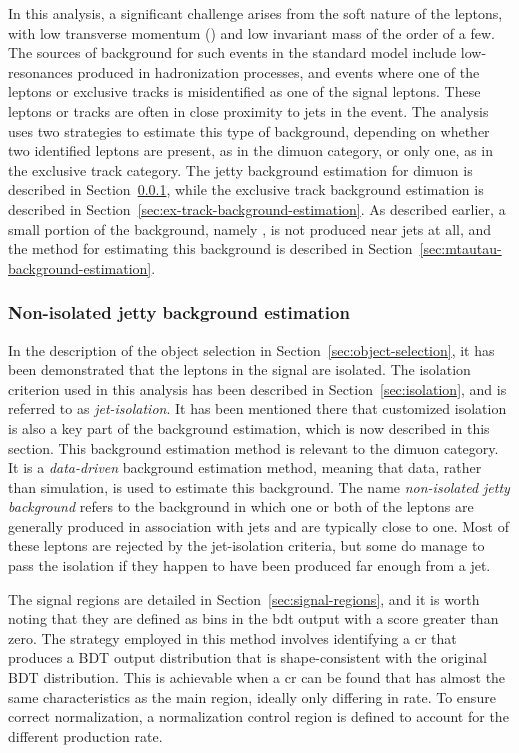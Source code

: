 In this analysis, a significant challenge arises from the soft nature of the leptons, with low transverse momentum (\pt) and low invariant mass of the order of a few\GeV. The sources of background for such events in the standard model include low-\pt resonances produced in hadronization processes, and events where one of the leptons or exclusive tracks is misidentified as one of the signal leptons. These leptons or tracks are often in close proximity to jets in the event. The analysis uses two strategies to estimate this type of background, depending on whether two identified leptons are present, as in the dimuon category, or only one, as in the exclusive track category. The jetty background estimation for dimuon is described in Section~\ref{sec:jetty-background-estimation}, while the exclusive track background estimation is described in Section~\ref{sec:ex-track-background-estimation}. As described earlier, a small portion of the background, namely \ztautau, is not produced near jets at all, and the method for estimating this background is described in Section~\ref{sec:mtautau-background-estimation}.

\clearpage
\subsubsection{Non-isolated jetty background estimation}
\label{sec:jetty-background-estimation}

In the description of the object selection in Section~\ref{sec:object-selection}, it has been demonstrated that the leptons in the signal are isolated. The isolation criterion used in this analysis has been described in Section~\ref{sec:isolation}, and is referred to as \emph{jet-isolation}. It has been mentioned there that customized isolation is also a key part of the background estimation, which is now described in this section. This background estimation method is relevant to the dimuon category. It is a \emph{data-driven} background estimation method, meaning that data, rather than simulation, is used to estimate this background. The name \emph{non-isolated jetty background} refers to the background in which one or both of the leptons are generally produced in association with jets and are typically close to one. Most of these leptons are rejected by the jet-isolation criteria, but some do manage to pass the isolation if they happen to have been produced far enough from a jet.

The signal regions are detailed in Section~\ref{sec:signal-regions}, and it is worth noting that they are defined as bins in the \gls{bdt} output with a score greater than zero. The strategy employed in this method involves identifying a \gls{cr} that produces a BDT output distribution that is shape-consistent with the original BDT distribution. This is achievable when a \gls{cr} can be found that has almost the same characteristics as the main region, ideally only differing in rate. To ensure correct normalization, a normalization control region is defined to account for the different production rate.


